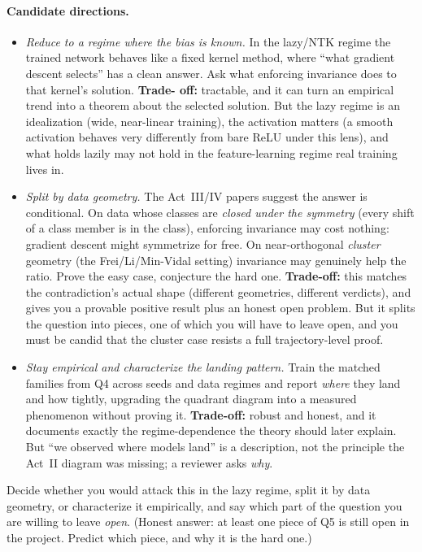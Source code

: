 \paragraph{Candidate directions.}
\begin{itemize}[leftmargin=1.4em]
  \item \emph{Reduce to a regime where the bias is known.} In the lazy/NTK regime the trained
        network behaves like a fixed kernel method, where ``what gradient descent selects'' has a
        clean answer. Ask what enforcing invariance does to that kernel's solution. \textbf{Trade-
        off:} tractable, and it can turn an empirical trend into a theorem about the selected
        solution. But the lazy regime is an idealization (wide, near-linear training), the activation
        matters (a smooth activation behaves very differently from bare ReLU under this lens), and
        what holds lazily may not hold in the feature-learning regime real training lives in.
  \item \emph{Split by data geometry.} The Act~III/IV papers suggest the answer is conditional. On
        data whose classes are \emph{closed under the symmetry} (every shift of a class member is in
        the class), enforcing invariance may cost nothing: gradient descent might symmetrize for
        free. On near-orthogonal \emph{cluster} geometry (the Frei/Li/Min-Vidal setting) invariance
        may genuinely help the ratio. Prove the easy case, conjecture the hard one.
        \textbf{Trade-off:} this matches the contradiction's actual shape (different geometries,
        different verdicts), and gives you a provable positive result plus an honest open problem.
        But it splits the question into pieces, one of which you will have to leave open, and you must
        be candid that the cluster case resists a full trajectory-level proof.
  \item \emph{Stay empirical and characterize the landing pattern.} Train the matched families from
        Q4 across seeds and data regimes and report \emph{where} they land and how tightly,
        upgrading the quadrant diagram into a measured phenomenon without proving it.
        \textbf{Trade-off:} robust and honest, and it documents exactly the regime-dependence the
        theory should later explain. But ``we observed where models land'' is a description, not the
        principle the Act~II diagram was missing; a reviewer asks \emph{why}.
\end{itemize}

\begin{problem}
Decide whether you would attack this in the lazy regime, split it by data geometry, or characterize
it empirically, and say which part of the question you are willing to leave \emph{open}. (Honest
answer: at least one piece of Q5 is still open in the project. Predict which piece, and why it is the
hard one.)
\end{problem}

